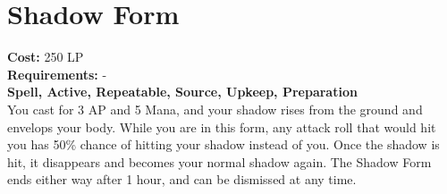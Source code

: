 \section{Shadow Form}\label{spell:shadowForm}
\textbf{Cost:} 250 LP\\
\textbf{Requirements:} -\\
\textbf{Spell, Active, Repeatable, Source, Upkeep, Preparation}\\
You cast for 3 AP and 5 Mana, and your shadow rises from the ground and envelops your body.
While you are in this form, any attack roll that would hit you has 50\% chance of hitting your shadow instead of you.
Once the shadow is hit, it disappears and becomes your normal shadow again.
The Shadow Form ends either way after 1 hour, and can be dismissed at any time.